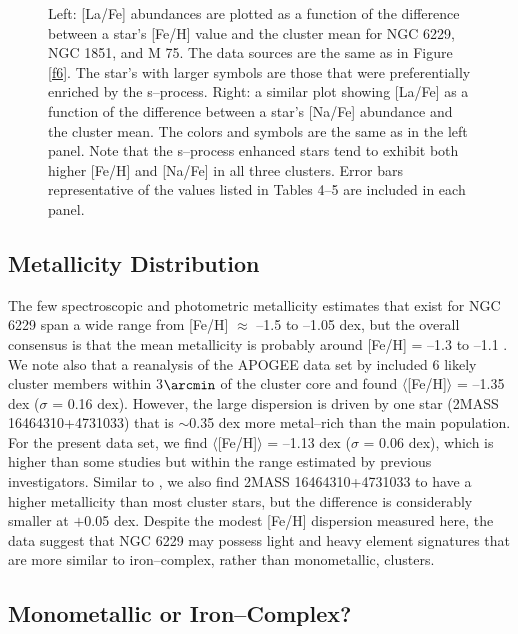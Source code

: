 \documentclass[12pt,preprint]{emulateapj}
\begin{document}
\begin{figure*}
\caption{Left: [La/Fe] abundances are plotted as a function of the difference
between a star's [Fe/H] value and the cluster mean for NGC 6229, NGC 1851, and
M 75.  The data sources are the same as in Figure \ref{f6}.  The star's with
larger symbols are those that were preferentially enriched by the s--process.
Right: a similar plot showing [La/Fe] as a function of the difference between
a star's [Na/Fe] abundance and the cluster mean.  The colors and symbols are
the same as in the left panel.  Note that the s--process enhanced stars tend
to exhibit both higher [Fe/H] and [Na/Fe] in all three clusters.  Error bars
representative of the values listed in Tables 4--5 are included in each
panel.}
\label{f8}
\end{figure*}

\subsection{Metallicity Distribution}

The few spectroscopic and photometric metallicity estimates that exist for
NGC 6229 span a wide range from [Fe/H] $\approx$ --1.5 to --1.05 dex, but 
the overall consensus is that the mean metallicity is probably around [Fe/H] =
--1.3 to --1.1 \citep{Pilachowski83,Carney91,Wachter98,Borissova99,Borissova01,
Arellano15}.  We note also that a reanalysis of the APOGEE data set by
\citet{Ness15} included 6 likely cluster members within 3$\arcmin$ of the 
cluster core and found $\langle$[Fe/H]$\rangle$ = --1.35 dex ($\sigma$ = 0.16 
dex).  However, the large dispersion is driven by one star (2MASS 
16464310+4731033) that is $\sim$0.35 dex more metal--rich than the main 
population.  For the present data set, we find $\langle$[Fe/H]$\rangle$ = 
--1.13 dex ($\sigma$ = 0.06 dex), which is higher than some studies but within 
the range estimated by previous investigators.  Similar to \citet{Ness15}, we 
also find 2MASS 16464310+4731033 to have a higher metallicity than most cluster
stars, but the difference is considerably smaller at $+$0.05 dex.  Despite the 
modest [Fe/H] dispersion measured here, the data suggest that NGC 6229 may 
possess light and heavy element signatures that are more similar to 
iron--complex, rather than monometallic, clusters.

\subsection{Monometallic or Iron--Complex?}
\end{document}
